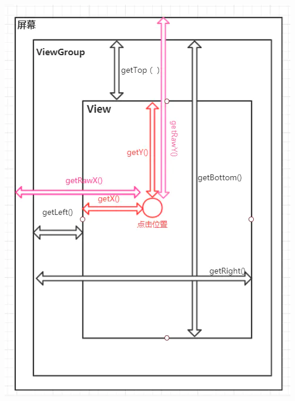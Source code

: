 \documentclass[9pt, b5paper]{article}
\begin{document}
\includegraphics[width=.9\linewidth]{./pic/view.png}
\end{document}
